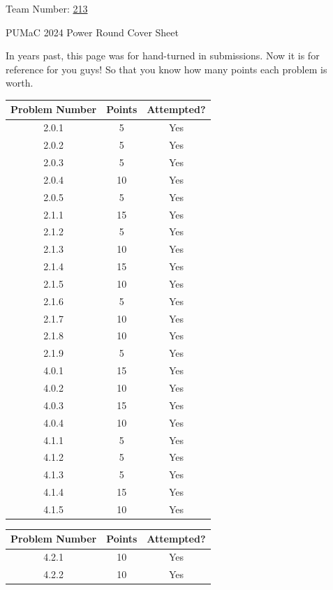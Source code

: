 \documentclass[11pt]{article}
\newcommand{\teamno}{213}
\begin{document}
\thispagestyle{empty}
\noindent \huge{Team Number:} \underline{\teamno\phantom{}}

\vspace{.5cm}
\noindent \huge{PUMaC 2024 Power Round Cover Sheet}

\vspace{.5cm}
\normalsize
In years past, this page was for hand-turned in submissions. Now it is for reference for you guys! So that you know how many points each problem is worth. 

\begin{center}
\begin{tabular}{|c|c|c|}\hline
Problem Number & Points & Attempted?\\\hline
2.0.1 & 5 & Yes \\\hline
2.0.2 & 5 & Yes \\\hline
2.0.3 & 5 & Yes \\\hline
2.0.4 & 10 & Yes \\\hline
2.0.5 & 5 & Yes \\\hline
2.1.1 & 15 & Yes \\\hline
2.1.2 & 5 & Yes \\\hline
2.1.3 & 10 & Yes \\\hline
2.1.4 & 15 & Yes \\\hline
2.1.5 & 10 & Yes \\\hline
2.1.6 & 5 & Yes \\\hline
2.1.7 & 10 & Yes \\\hline
2.1.8 & 10 & Yes \\\hline
2.1.9 & 5 & Yes \\\hline
4.0.1 & 15 & Yes \\\hline
4.0.2 & 10 & Yes \\\hline
4.0.3 & 15 & Yes \\\hline
4.0.4 & 10 & Yes \\\hline
4.1.1 & 5 & Yes \\\hline
4.1.2 & 5 & Yes \\\hline
4.1.3 & 5 & Yes \\\hline
4.1.4 & 15 & Yes \\\hline
4.1.5 & 10 & Yes \\\hline
\end{tabular}
\hspace{0.5 cm}
\begin{tabular}{|c|c|c|}\hline
Problem Number & Points & Attempted?\\\hline
4.2.1 & 10 & Yes \\\hline
4.2.2 & 10 & Yes \\\hline

\end{tabular}
\end{center}
\end{document}
